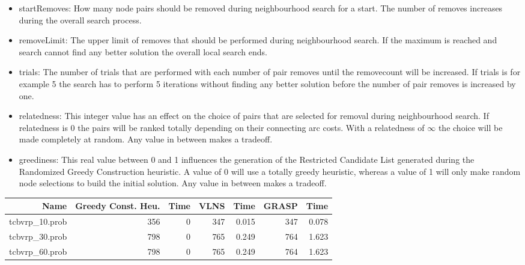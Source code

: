 \documentclass[a4paper]{scrartcl}
\begin{document}
\begin{itemize}
  \item startRemoves: How many node pairs should be removed during neighbourhood search for a start. The number of removes increases during the overall search process.
  \item removeLimit: The upper limit of removes that should be performed during neighbourhood search. If the maximum is reached and search cannot find any better solution the overall local search ends.

  \item trials: The number of trials that are performed with each number of pair removes until the removecount will be increased. If trials is for example 5 the search has to perform 5 iterations without finding any better solution before the number of pair removes is increased by one.

  \item relatedness: This integer value has an effect on the choice of pairs that are selected for removal during neighbourhood search. If relatedness is 0 the pairs will be ranked totally depending on their connecting arc costs. With a relatedness of $\infty$ the choice will be made completely at random. Any value in between makes a tradeoff.

  \item greediness: This real value between 0 and 1 influences the generation of the Restricted Candidate List generated during the Randomized Greedy Construction heuristic. A value of 0 will use a totally greedy heuristic, whereas a value of 1 will only make random node selections to build the initial solution. Any value in between makes a tradeoff.
\end{itemize}



\begin{tabular}{r | r | r | r | r | r | r}
\hline
Name & Greedy Const. Heu. & Time & VLNS & Time & GRASP & Time \\
\hline \hline 
tcbvrp\_10.prob & 356 & 0 & 347 & 0.015 & 347 & 0.078 \\
\hline
tcbvrp\_30.prob & 798 & 0 & 765 & 0.249 & 764 & 1.623 \\
\hline
tcbvrp\_60.prob & 798 & 0 & 765 & 0.249 & 764 & 1.623 \\

\end{tabular}





\end{document}
